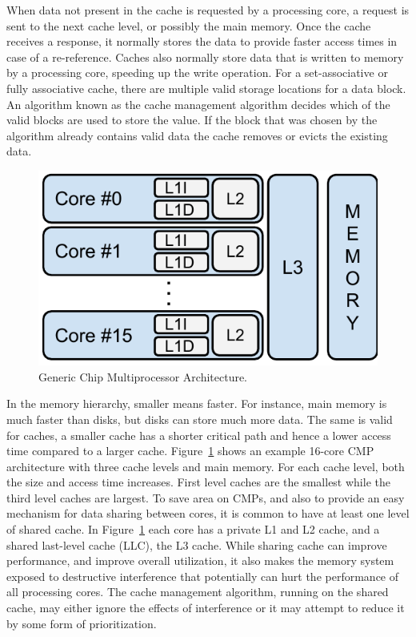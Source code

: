 When data not present in the cache is requested by a processing core, a request is sent to the next cache level, or possibly the main memory.
Once the cache receives a response, it normally stores the data to provide faster access times in case of a re-reference.
Caches also normally store data that is written to memory by a processing core, speeding up the write operation.
For a set-associative or fully associative cache, there are multiple valid storage locations for a data block.
An algorithm known as the cache management algorithm decides which of the valid blocks are used to store the value.
If the block that was chosen by the algorithm already contains valid data the cache removes or evicts the existing data.

\begin{figure}[ht]
\centering
\includegraphics[scale=.65]{figures/processor_model/processor_model}
\caption{Generic Chip Multiprocessor Architecture.}
\label{fig:cmp_model}
\end{figure}

In the memory hierarchy, smaller means faster. 
For instance, main memory is much faster than disks, but disks can store much more data.
The same is valid for caches, a smaller cache has a shorter critical path and hence a lower access time compared to a larger cache.
Figure~\ref{fig:cmp_model} shows an example 16-core CMP architecture with three cache levels and main memory.
For each cache level, both the size and access time increases.
First level caches are the smallest while the third level caches are largest.
To save area on CMPs, and also to provide an easy mechanism for data sharing between cores, it is common to have at least one level of shared cache.
In Figure~\ref{fig:cmp_model} each core has a private L1 and L2 cache, and a shared last-level cache (LLC), the L3 cache.
While sharing cache can improve performance, and improve overall utilization, it also makes the memory system exposed to destructive interference that potentially can hurt the performance of all processing cores. 
The cache management algorithm, running on the shared cache, may either ignore the effects of interference or it may attempt to reduce it by some form of prioritization.

